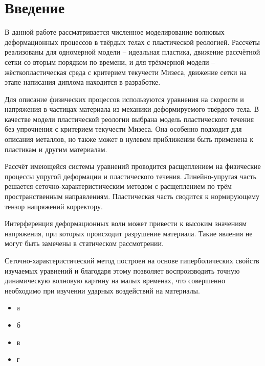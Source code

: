 \section*{Введение}
В данной работе рассматривается численное моделирование волновых деформационных процессов в твёрдых телах с пластической реологией. Рассчёты реализованы для одномерной модели -- идеальная пластика, движение рассчётной сетки со вторым порядком по времени, и для трёхмерной модели -- жёсткопластическая среда с критерием текучести Мизеса, движение сетки на этапе написания диплома находится в разработке. 

Для описание физических процессов используются уравнения на скорости и напряжения в частицах материала из механики деформируемого твёрдого тела. В качестве модели пластической реологии выбрана модель пластического течения без упрочнения с критерием текучести Мизеса. Она особенно подходит для описания металлов, но также может в нулевом приближении быть применена к пластикам и другим материалам.

Рассчёт имеющейся системы уравнений проводится расщеплением на физические процессы упругой деформации и пластического течения. Линейно-упругая часть решается сеточно-характеристическим методом с расщеплением по трём пространственным направлениям. Пластическая часть сводится к нормирующему тензор напряжений корректору. 

Интерференция деформационных волн может привести к высоким значениям напряжения, при которых происходит разрушение материала. Такие явления не могут быть замечены в статическом рассмотрении. 

Сеточно-характеристический метод построен на основе гиперболических свойств изучаемых уравнений и благодаря этому позволяет воспроизводить точную динамическую волновую картину на малых временах, что совершенно необходимо при изучении ударных воздействий на материалы. 


\begin{itemize}
\item а
\item б
\item в
\item г
\end{itemize}
